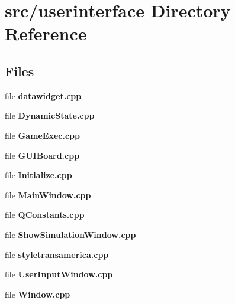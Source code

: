 \section{src/userinterface Directory Reference}
\label{dir_6a9bbfda24ff156040a5bbe170f94215}
\subsection*{Files}
\begin{DoxyCompactItemize}
\item 
file {\bfseries datawidget.\-cpp}
\item 
file {\bfseries Dynamic\-State.\-cpp}
\item 
file {\bfseries Game\-Exec.\-cpp}
\item 
file {\bfseries G\-U\-I\-Board.\-cpp}
\item 
file {\bfseries Initialize.\-cpp}
\item 
file {\bfseries Main\-Window.\-cpp}
\item 
file {\bfseries Q\-Constants.\-cpp}
\item 
file {\bfseries Show\-Simulation\-Window.\-cpp}
\item 
file {\bfseries styletransamerica.\-cpp}
\item 
file {\bfseries User\-Input\-Window.\-cpp}
\item 
file {\bfseries Window.\-cpp}
\end{DoxyCompactItemize}
